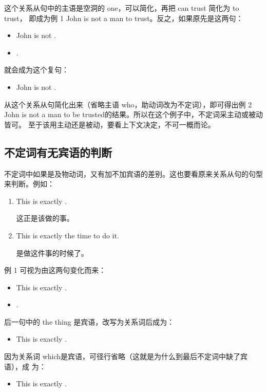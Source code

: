 这个关系从句中的主语是空洞的 one，可以简化，再把 can trust 简化为 to trust，
即成为例 1 John is not a man to trust。反之，如果原先是这两句：
\begin{itemize}
\item John is not .
\item {} .
\end{itemize}
就会成为这个复句：
\begin{itemize}
\item John is not  .
\end{itemize}
从这个关系从句简化出来（省略主语 who，助动词改为不定词），即可得出例 2 John
is not a man to be trusted的结果。所以在这个例子中，不定词采主动或被动皆可。
至于该用主动还是被动，要看上下文决定，不可一概而论。

\subsection{不定词有无宾语的判断}

不定词中如果是及物动词，又有加不加宾语的差别。这也要看原来关系从句的句型来判断。例如：
\begin{enumerate}
\item This is exactly  .

  这正是该做的事。
\item   This is exactly the time to do it.

  是做这件事的时候了。
\end{enumerate}

例 1 可视为由这两句变化而来：
\begin{itemize}
\item This is exactly .
\item {}  .
\end{itemize}
后一句中的 the thing 是宾语，改写为关系词后成为：
\begin{itemize}
\item This is exactly  .
\end{itemize}
因为关系词 which是宾语，可径行省略（这就是为什么到最后不定词中缺了宾语），成
为：
\begin{itemize}
\item This is exactly  .
\end{itemize}

